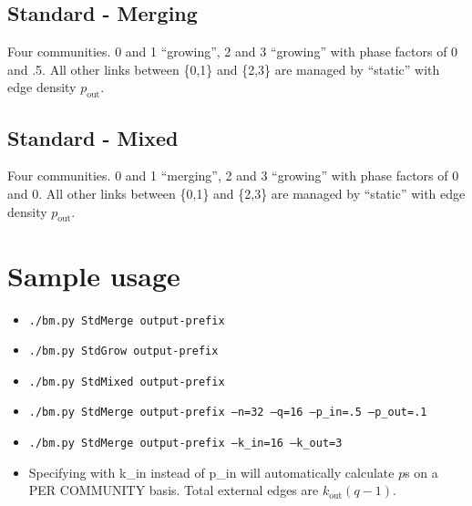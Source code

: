 \documentclass{article}
\def\pout{p_\mathrm{out}}
\def\out{\mathrm{out}}
\begin{document}
\subsection{Standard - Merging}
Four communities.  0 and 1 ``growing'', 2 and 3 ``growing'' with phase
factors of 0 and .5.  All other links between \{0,1\} and \{2,3\} are
managed by ``static'' with edge density $\pout$.

\subsection{Standard - Mixed}
Four communities.  0 and 1 ``merging'', 2 and 3 ``growing'' with phase
factors of 0 and 0.  All other links between \{0,1\} and \{2,3\} are
managed by ``static'' with edge density $\pout$.



\section{Sample usage}

\begin{itemize}
\item \texttt{./bm.py StdMerge output-prefix}
\item \texttt{./bm.py StdGrow output-prefix}
\item \texttt{./bm.py StdMixed output-prefix}
\item \texttt{./bm.py StdMerge output-prefix --n=32 --q=16 --p\_in=.5 --p\_out=.1}
\item \texttt{./bm.py StdMerge output-prefix --k\_in=16 --k\_out=3}
\item Specifying with k\_in instead of p\_in will automatically
  calculate $p$s on a PER COMMUNITY basis.  Total external edges are $k_\out(q-1)$.
\end{itemize}
\end{document}
